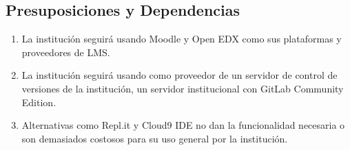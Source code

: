 \subsection{Presuposiciones y Dependencias}
\begin{enumerate}
	\item La institución seguirá usando Moodle y Open EDX como sus plataformas y proveedores de LMS.
	\item La institución seguirá usando como proveedor de un servidor de control de versiones de la institución, un servidor institucional con GitLab Community Edition.
	\item Alternativas como Repl.it y Cloud9 IDE no dan la funcionalidad necesaria o son demasiados costosos para su uso general por la institución.
\end{enumerate}

\pagebreak

